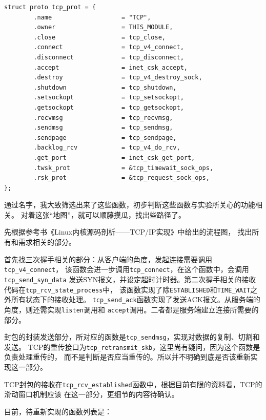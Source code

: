 \documentclass[11pt, a4paper,oneside]{book}
\theoremstyle{ocrenumbox}
\theoremstyle{purplenumbox}
\theoremstyle{blackbox}
\begin{document}
\begin{verbatim}
struct proto tcp_prot = {
        .name                   = "TCP",
        .owner                  = THIS_MODULE,
        .close                  = tcp_close,
        .connect                = tcp_v4_connect,
        .disconnect             = tcp_disconnect,
        .accept                 = inet_csk_accept,
        .destroy                = tcp_v4_destroy_sock,
        .shutdown               = tcp_shutdown,
        .setsockopt             = tcp_setsockopt,
        .getsockopt             = tcp_getsockopt,
        .recvmsg                = tcp_recvmsg,
        .sendmsg                = tcp_sendmsg,
        .sendpage               = tcp_sendpage,
        .backlog_rcv            = tcp_v4_do_rcv,
        .get_port               = inet_csk_get_port,
        .twsk_prot              = &tcp_timewait_sock_ops,
        .rsk_prot               = &tcp_request_sock_ops,
};
\end{verbatim}

通过名字，我大致筛选出来了这些函数，初步判断这些函数与实验所关心的功能相关。
对着这张``地图''，就可以顺藤摸瓜，找出些路径了。

先根据参考书《Linux内核源码剖析------TCP/IP实现》中给出的流程图，
找出所有和需求相关的部分。

首先找三次握手相关的部分：从客户端的角度，发起连接需要调用\texttt{tcp_v4_connect}，
该函数会进一步调用\texttt{tcp_connect}，在这个函数中，会调用\texttt{tcp_send_syn_data}
发送SYN报文，并设定超时计时器。第二次握手相关的接收代码在\texttt{tcp_rcv_state_process}中，
该函数实现了除\texttt{ESTABLISHED}和\texttt{TIME_WAIT}之外所有状态下的接收处理。
\texttt{tcp_send_ack}函数实现了发送ACK报文。从服务端的角度，则还需实现\texttt{listen}调用和
\texttt{accept}调用。二者都是服务端建立连接所需要的部分。

封包的封装发送部分，所对应的函数是\texttt{tcp_sendmsg}，实现对数据的复制、切割和发送。
TCP的重传接口为\texttt{tcp_retransmit_skb}，这里尚有疑问，因为这个函数是负责处理重传的，
而不是判断是否应当重传的。所以并不明确到底是否该重新实现这一部分。

TCP封包的接收在\texttt{tcp_rcv_established}函数中，根据目前有限的资料看，TCP的滑动窗口机制应该
在这一部分，更细节的内容待确认。

目前，待重新实现的函数列表是：
\end{document}

